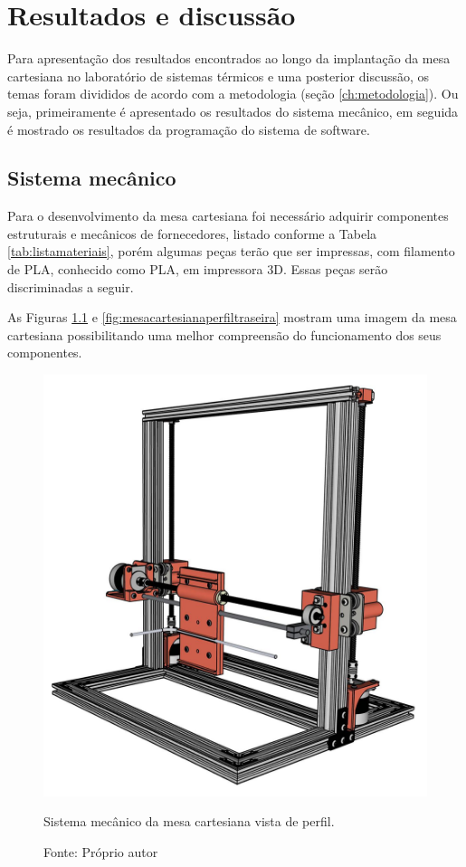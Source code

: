 \chapter{Resultados e discussão}
\label{chap:resultados}

Para apresentação dos resultados encontrados ao longo da implantação da mesa cartesiana no 
laboratório de sistemas térmicos e uma posterior discussão, os temas foram divididos de acordo 
com a metodologia (seção \ref{ch:metodologia}). Ou seja, primeiramente é apresentado os resultados do sistema mecânico, 
em seguida é mostrado os resultados da programação do sistema de software.

\section{Sistema mecânico}\label{sec:resmecanico}

Para o desenvolvimento da mesa cartesiana foi necessário adquirir componentes estruturais e 
mecânicos de fornecedores, listado conforme a Tabela \ref{tab:listamateriais}, porém algumas peças terão 
que ser impressas, com filamento de \ac{PLA}, conhecido 
como \ac{PLA}, em impressora 3D. Essas peças serão discriminadas a seguir. 

As Figuras \ref{fig:mesacartesianaperfil} e \ref{fig:mesacartesianaperfiltraseira} mostram uma 
imagem da mesa cartesiana possibilitando uma melhor compreensão do funcionamento dos seus componentes.

\begin{figure}[H]
\centering
\includegraphics[scale = 0.35]{figuras/mesacartesianaperfil}
\caption{Sistema mecânico da mesa cartesiana vista de perfil.}
\caption*{Fonte: Próprio autor}
\label{fig:mesacartesianaperfil}
\end{figure}

